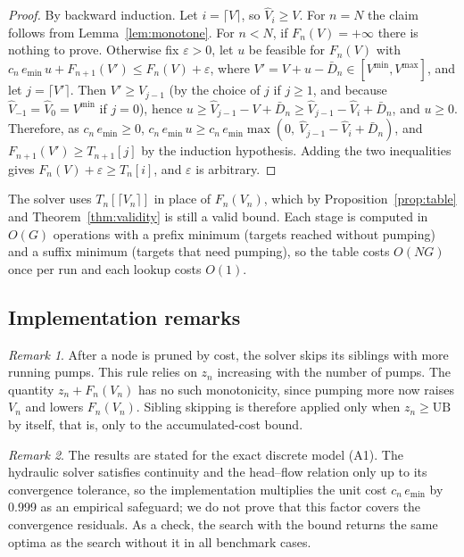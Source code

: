 \documentclass[11pt]{article}
\theoremstyle{remark}
\newtheorem{remark}{Remark}
\newcommand{\emin}{e_{\min}}
\newcommand{\Vmin}{V^{\min}}
\newcommand{\Vmax}{V^{\max}}
\begin{document}
\begin{proof}
By backward induction. Let $i = \lceil V \rceil$, so $\hat V_i \ge V$. For $n = N$ the
claim follows from Lemma~\ref{lem:monotone}. For $n < N$, if $F_n(V) = +\infty$ there is
nothing to prove. Otherwise fix $\varepsilon > 0$, let $u$ be feasible for $F_n(V)$ with
$c_n\, \emin\, u + F_{n+1}(V') \le F_n(V) + \varepsilon$, where
$V' = V + u - \bar D_n \in [\Vmin, \Vmax]$, and let $j = \lceil V' \rceil$. Then
$V' \ge \hat V_{j-1}$ (by the choice of $j$ if $j \ge 1$, and because
$\hat V_{-1} = \hat V_0 = \Vmin$ if $j = 0$), hence
$u \ge \hat V_{j-1} - V + \bar D_n \ge \hat V_{j-1} - \hat V_i + \bar D_n$, and
$u \ge 0$. Therefore, as $c_n\, \emin \ge 0$,
$c_n\, \emin\, u \ge c_n\, \emin \max(0,\ \hat V_{j-1} - \hat V_i + \bar D_n)$, and
$F_{n+1}(V') \ge T_{n+1}[j]$ by the induction hypothesis. Adding the two inequalities
gives $F_n(V) + \varepsilon \ge T_n[i]$, and $\varepsilon$ is arbitrary.
\end{proof}

The solver uses $T_n[\lceil V_n \rceil]$ in place of $F_n(V_n)$, which by
Proposition~\ref{prop:table} and Theorem~\ref{thm:validity} is still a valid bound. Each
stage is computed in $O(G)$ operations with a prefix minimum (targets reached without
pumping) and a suffix minimum (targets that need pumping), so the table costs $O(NG)$
once per run and each lookup costs $O(1)$.

\subsection{Implementation remarks}\label{sec:remarks}

\begin{remark}\label{rem:siblings}
After a node is pruned by cost, the solver skips its siblings with more running pumps.
This rule relies on $z_n$ increasing with the number of pumps. The quantity
$z_n + F_n(V_n)$ has no such monotonicity, since pumping more now raises $V_n$ and lowers
$F_n(V_n)$. Sibling skipping is therefore applied only when $z_n \ge \mathrm{UB}$ by
itself, that is, only to the accumulated-cost bound.
\end{remark}

\begin{remark}\label{rem:tolerance}
The results are stated for the exact discrete model (A1). The hydraulic solver satisfies
continuity and the head--flow relation only up to its convergence tolerance, so the
implementation multiplies the unit cost $c_n\, \emin$ by 0.999 as an empirical safeguard;
we do not prove that this factor covers the convergence residuals. As a check, the search
with the bound returns the same optima as the search without it in all benchmark cases.
\end{remark}
\end{document}
